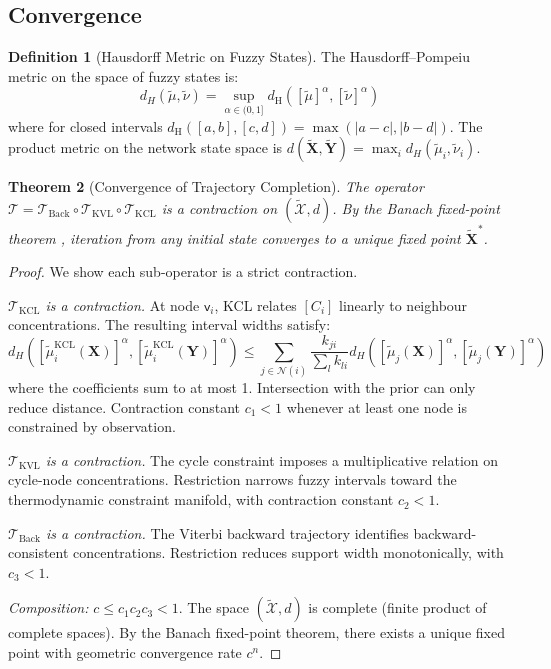 \documentclass[10pt,twocolumn,a4paper]{article}
\theoremstyle{plain}
\newtheorem{theorem}{Theorem}[section]
\theoremstyle{definition}
\newtheorem{definition}[theorem]{Definition}
\theoremstyle{remark}
\newcommand{\fnode}{\mathsf{v}}
\begin{document}
\subsection{Convergence}

\begin{definition}[Hausdorff Metric on Fuzzy States]
\label{def:hausdorff}
The Hausdorff--Pompeiu metric on the space of fuzzy states is:
\begin{equation}
    d_H(\widetilde{\mu}, \widetilde{\nu}) = \sup_{\alpha \in (0,1]} d_{\mathrm{H}}([\widetilde{\mu}]^\alpha, [\widetilde{\nu}]^\alpha)
\end{equation}
where for closed intervals $d_{\mathrm{H}}([a,b], [c,d]) = \max(|a-c|, |b-d|)$. The product metric on the network state space is $d(\widetilde{\mathbf{X}}, \widetilde{\mathbf{Y}}) = \max_i d_H(\widetilde{\mu}_i, \widetilde{\nu}_i)$.
\end{definition}

\begin{theorem}[Convergence of Trajectory Completion]
\label{thm:convergence}
The operator $\mathcal{T} = \mathcal{T}_{\mathrm{Back}} \circ \mathcal{T}_{\mathrm{KVL}} \circ \mathcal{T}_{\mathrm{KCL}}$ is a contraction on $(\widetilde{\mathcal{X}}, d)$. By the Banach fixed-point theorem \citep{banach1922}, iteration from any initial state converges to a unique fixed point $\widetilde{\mathbf{X}}^*$.
\end{theorem}

\begin{proof}
We show each sub-operator is a strict contraction.

\emph{$\mathcal{T}_{\mathrm{KCL}}$ is a contraction.} At node $\fnode_i$, KCL relates $[C_i]$ linearly to neighbour concentrations. The resulting interval widths satisfy:
\begin{equation}
    d_H([\widetilde{\mu}_i^{\mathrm{KCL}}(\mathbf{X})]^\alpha, [\widetilde{\mu}_i^{\mathrm{KCL}}(\mathbf{Y})]^\alpha) \leq \sum_{j \in \mathcal{N}(i)} \frac{k_{ji}}{\sum_l k_{li}} d_H([\widetilde{\mu}_j(\mathbf{X})]^\alpha, [\widetilde{\mu}_j(\mathbf{Y})]^\alpha)
\end{equation}
where the coefficients sum to at most 1. Intersection with the prior can only reduce distance. Contraction constant $c_1 < 1$ whenever at least one node is constrained by observation.

\emph{$\mathcal{T}_{\mathrm{KVL}}$ is a contraction.} The cycle constraint imposes a multiplicative relation on cycle-node concentrations. Restriction narrows fuzzy intervals toward the thermodynamic constraint manifold, with contraction constant $c_2 < 1$.

\emph{$\mathcal{T}_{\mathrm{Back}}$ is a contraction.} The Viterbi backward trajectory identifies backward-consistent concentrations. Restriction reduces support width monotonically, with $c_3 < 1$.

\emph{Composition:} $c \leq c_1 c_2 c_3 < 1$. The space $(\widetilde{\mathcal{X}}, d)$ is complete (finite product of complete spaces). By the Banach fixed-point theorem, there exists a unique fixed point with geometric convergence rate $c^n$.
\end{proof}
\end{document}
